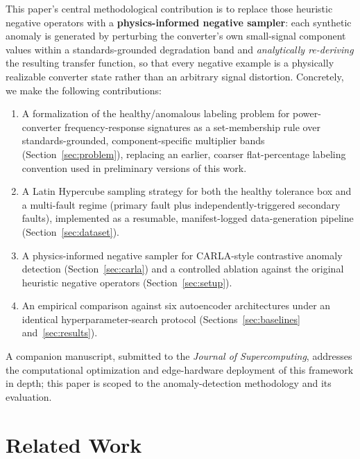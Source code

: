 \documentclass[11pt,a4paper]{article}
\begin{document}
This paper's central methodological contribution is to replace those heuristic negative
operators with a \textbf{physics-informed negative sampler}: each synthetic anomaly is
generated by perturbing the converter's own small-signal component values within a
standards-grounded degradation band and \emph{analytically re-deriving} the resulting
transfer function, so that every negative example is a physically realizable converter
state rather than an arbitrary signal distortion. Concretely, we make the following
contributions:
\begin{enumerate}
    \item A formalization of the healthy/anomalous labeling problem for power-converter
    frequency-response signatures as a set-membership rule over standards-grounded,
    component-specific multiplier bands (Section~\ref{sec:problem}), replacing an earlier,
    coarser flat-percentage labeling convention used in preliminary versions of this work.
    \item A Latin Hypercube sampling strategy for both the healthy tolerance box and a
    multi-fault regime (primary fault plus independently-triggered secondary faults),
    implemented as a resumable, manifest-logged data-generation pipeline
    (Section~\ref{sec:dataset}).
    \item A physics-informed negative sampler for CARLA-style contrastive anomaly
    detection (Section~\ref{sec:carla}) and a controlled ablation against the original
    heuristic negative operators (Section~\ref{sec:setup}).
    \item An empirical comparison against six autoencoder architectures under an
    identical hyperparameter-search protocol (Sections~\ref{sec:baselines}
    and~\ref{sec:results}).
\end{enumerate}
A companion manuscript, submitted to the \emph{Journal of Supercomputing}, addresses the
computational optimization and edge-hardware deployment of this framework in depth; this
paper is scoped to the anomaly-detection methodology and its evaluation.

\section{Related Work}
\label{sec:related}
\end{document}

